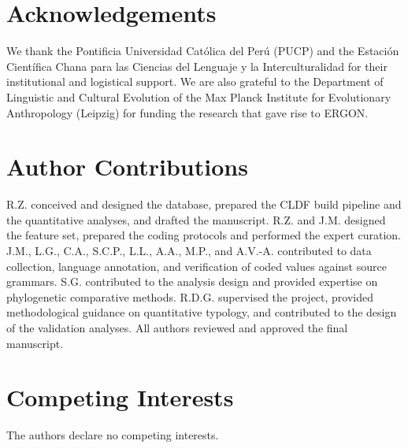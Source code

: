 \documentclass[12pt,a4paper]{article}
\begin{document}
\section*{Acknowledgements}

We thank the Pontificia Universidad Cat\'{o}lica del Per\'{u} (PUCP) and the Estaci\'{o}n Cient\'{i}fica Chana para las Ciencias del Lenguaje y la Interculturalidad for their institutional and logistical support. We are also grateful to the Department of Linguistic and Cultural Evolution of the Max Planck Institute for Evolutionary Anthropology (Leipzig) for funding the research that gave rise to ERGON.

\section*{Author Contributions}

R.Z. conceived and designed the database, prepared the CLDF build pipeline and the quantitative analyses, and drafted the manuscript. R.Z. and J.M. designed the feature set, prepared the coding protocols and performed the expert curation. J.M., L.G., C.A., S.C.P., L.L., A.A., M.P., and A.V.-A. contributed to data collection, language annotation, and verification of coded values against source grammars. S.G. contributed to the analysis design and provided expertise on phylogenetic comparative methods. R.D.G. supervised the project, provided methodological guidance on quantitative typology, and contributed to the design of the validation analyses. All authors reviewed and approved the final manuscript.

\section*{Competing Interests}

The authors declare no competing interests.
\end{document}
